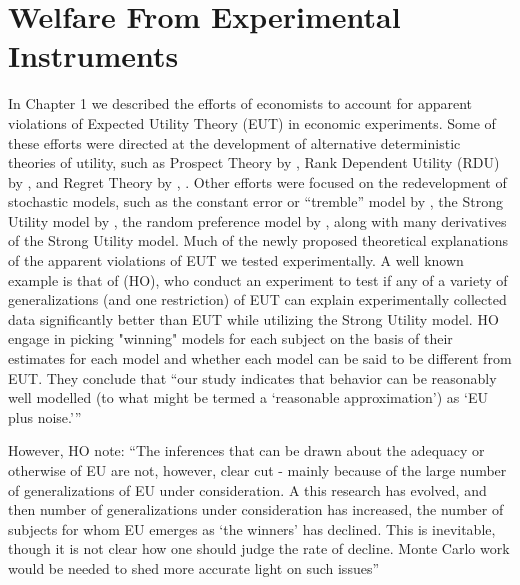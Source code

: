\documentclass[../main.tex]{subfiles}
\begin{document}
\onehalfspacing
\setcounter{chapter}{3}

\chapter{Welfare From Experimental Instruments}

\lltoc %

In Chapter 1 we described the efforts of economists to account for apparent violations of Expected Utility Theory (EUT) in economic experiments.
Some of these efforts were directed at the development of alternative deterministic theories of utility, such as Prospect Theory by \textcite{Kahneman1979}, Rank Dependent Utility (RDU) by \textcite{Quiggin1982}, and Regret Theory by \textcite{Bell1982}, \textcite{Loomes1982}.
Other efforts were focused on the redevelopment of stochastic models, such as the constant error or \enquote{tremble} model by \textcite{Harless1994}, the Strong Utility model by \textcite{Hey1994}, the random preference model by \textcite{Loomes1995}, along with many derivatives of the Strong Utility model.
Much of the newly proposed theoretical explanations of the apparent violations of EUT we tested experimentally.
A well known example is that of \textcite{Hey1994} (HO), who conduct an experiment to test if any of a variety of generalizations (and one restriction) of EUT can explain experimentally collected data significantly better than EUT while utilizing the Strong Utility model.
HO engage in picking "winning" models for each subject on the basis of their estimates for each model and whether each model can be said to be different from EUT.
They conclude that \enquote{our study indicates that behavior can be reasonably well modelled (to what might be termed a \enquote{reasonable approximation}) as \enquote{EU plus noise.}}

However, HO note:
\enquote{The inferences that can be drawn \textelp{} about the adequacy or otherwise of EU are not, however, clear cut - mainly because of the large number of generalizations of EU under consideration.
A this research has evolved, and then number of generalizations under consideration has increased, the number of subjects for whom EU emerges as \enquote{the winners} has declined. 
This is inevitable, though it is not clear how one should judge the rate of decline.
\textelp{} Monte Carlo work would be needed to shed more accurate light on such issues}
\end{document}
